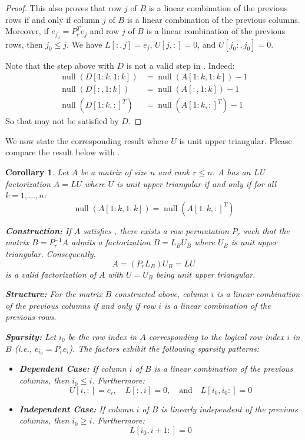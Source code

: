 \documentclass{article}
\DeclareMathOperator{\nl}{null}
\newtheorem{corollary}{Corollary}[section]
\begin{document}
\begin{proof}
    This also proves that row $j$ of $B$ is a linear combination of the previous rows if and only if column $j$ of $B$ is a linear combination of the previous columns. Moreover, if $e_{j_0} = P_c^T e_j$ and row $j$ of $B$ is a linear combination of the previous rows, then $j_0 \le j$. We have $L[:,j] = e_j$, $U[j,:] = 0$, and $U[j_0:,j_0] = 0$.

    Note that the step above with $D$ is not a valid step in . Indeed:
    \begin{align*}
        \nl(D[1:k,1:k])   & = \nl(A[1:k,1:k]) - 1 \\
        \nl(D[:,1:k])     & = \nl(A[:,1:k]) - 1 \\
        \nl({D[1:k,:]}^T) & = \nl({A[1:k,:]}^T) - 1
    \end{align*}
    So that  may not be satisfied by $D$.
\end{proof}

We now state the corresponding result where $U$ is unit upper triangular. Please compare the result below with .

\begin{corollary}\label{corr:main_unit_upper}
    Let $A$ be a matrix of size $n$ and rank $r \le n$. $A$ has an LU factorization $A = LU$ where $U$ is unit upper triangular if and only if for all $k = 1, \ldots, n$:
    \begin{equation}
        \label{eq:cond_unit_upper}
        \nl(A[1:k,1:k]) = \nl({A[1:k,:]}^T)
    \end{equation}

    \noindent\textbf{Construction:} If $A$ satisfies , there exists a row permutation $P_r$ such that the matrix $B = P_r^{-1} A$ admits a factorization $B = L_B U_B$ where $U_B$ is unit upper triangular. Consequently,
    \[ A = (P_r L_B) U_B = L U \]
    is a valid factorization of $A$ with $U=U_B$ being unit upper triangular.

    \noindent\textbf{Structure:} For the matrix $B$ constructed above, column $i$ is a linear combination of the previous columns if and only if row $i$ is a linear combination of the previous rows.

    \noindent\textbf{Sparsity:} Let $i_0$ be the row index in $A$ corresponding to the logical row index $i$ in $B$ (i.e., $e_{i_0} = P_r e_i$). The factors exhibit the following sparsity patterns:
    \begin{itemize}
        \item \textbf{Dependent Case:} If column $i$ of $B$ is a linear combination of the previous columns, then $i_0 \le i$. Furthermore:
        \[ U[i,:] = e_i, \quad L[:,i] = 0, \quad \text{and} \quad L[i_0, i_0:] = 0 \]
        \item \textbf{Independent Case:} If column $i$ of $B$ is linearly independent of the previous columns, then $i_0 \ge i$. Furthermore:
        \[ L[i_0, i+1:] = 0 \]
    \end{itemize}
\end{corollary}
\end{document}
